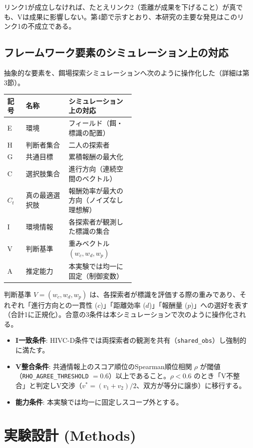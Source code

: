 \documentclass[11pt]{ltjsarticle}
\newcommand{\Ct}{\ensuremath{C_t}}
\begin{document}
リンク1が成立しなければ、たとえリンク2（乖離が成果を下げること）が真でも、Vは成果に影響しない。第4節で示すとおり、本研究の主要な発見はこのリンク1の不成立である。

\subsection{フレームワーク要素のシミュレーション上の対応}

抽象的な要素を、餌場探索シミュレーションへ次のように操作化した（詳細は第3節）。

\begin{longtable}{@{}l l p{0.52\linewidth}@{}}
\toprule
記号 & 名称 & シミュレーション上の対応 \\
\midrule
E    & 環境 & フィールド（餌・標識の配置） \\
H    & 判断者集合 & 二人の探索者 \\
G    & 共通目標 & 累積報酬の最大化 \\
C    & 選択肢集合 & 進行方向（連続空間のベクトル） \\
\Ct{} & 真の最適選択肢 & 報酬効率が最大の方向（ノイズなし理想解） \\
I    & 環境情報 & 各探索者が観測した標識の集合 \\
V    & 判断基準 & 重みベクトル $(w_c, w_d, w_p)$ \\
A    & 推定能力 & 本実験では均一に固定（制御変数） \\
\bottomrule
\end{longtable}

判断基準 $V = (w_c, w_d, w_p)$ は、各探索者が標識を評価する際の重みであり、それぞれ「進行方向との一貫性 ($c$)」「距離効率 ($d$)」「報酬量 ($p$)」への選好を表す（合計1に正規化）。合意の3条件は本シミュレーションで次のように操作化される。

\begin{itemize}[nosep]
  \item \textbf{I一致条件}: HIVC-D条件では両探索者の観測を共有（\texttt{shared\_obs}）し強制的に満たす。
  \item \textbf{V整合条件}: 共通情報上のスコア順位のSpearman順位相関 $\rho$ が閾値（\texttt{RHO\_AGREE\_THRESHOLD} $= 0.6$）以上であること。$\rho < 0.6$ のとき「V不整合」と判定しV交渉（$v^* = (v_1 + v_2)/2$、双方が等分に譲歩）に移行する。
  \item \textbf{能力条件}: 本実験では均一に固定しスコープ外とする。
\end{itemize}

\section{実験設計 (Methods)}
\end{document}
